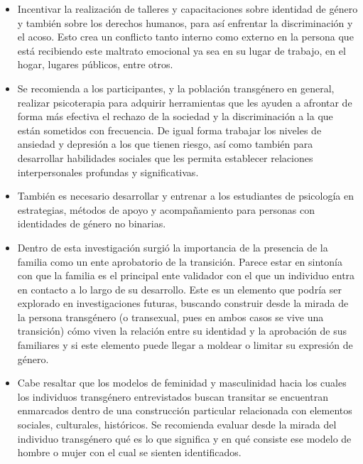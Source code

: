 \begin{itemize}
\item Incentivar la realización de talleres y capacitaciones sobre identidad de
género y también sobre los derechos humanos, para así enfrentar la
discriminación y el acoso. Esto crea un conflicto tanto interno como externo en
la persona que está recibiendo este maltrato emocional ya sea en su lugar de
trabajo, en el hogar, lugares públicos, entre otros.

\item Se recomienda a los participantes, y la población transgénero en general,
realizar psicoterapia para adquirir herramientas que les ayuden a afrontar de
forma más efectiva el rechazo de la sociedad y la discriminación a la que están
sometidos con frecuencia. De igual forma trabajar los niveles de ansiedad y
depresión a los que tienen riesgo, así como también para desarrollar habilidades
sociales que les permita establecer relaciones interpersonales profundas y
significativas.

\item También es necesario desarrollar y entrenar a los estudiantes de
psicología en estrategias, métodos de apoyo y acompañamiento para personas con
identidades de género no binarias.

\item Dentro de esta investigación surgió la importancia de la presencia de la
familia como un ente aprobatorio de la transición. Parece estar en sintonía con
que la familia es el principal ente validador con el que un
individuo entra en contacto a lo largo de su desarrollo. Este es un elemento que
podría ser explorado en investigaciones futuras, buscando construir desde la
mirada de la persona transgénero (o transexual, pues en ambos casos se vive una
transición) cómo viven la relación entre su identidad y la aprobación de sus
familiares y si este elemento puede llegar a moldear o limitar su expresión de
género.

\item Cabe resaltar que los modelos de feminidad y masculinidad hacia los cuales
los individuos transgénero entrevistados buscan transitar se encuentran
enmarcados dentro de una construcción particular relacionada con elementos
sociales, culturales, históricos. Se recomienda evaluar desde la mirada del
individuo transgénero qué es lo que significa y en qué consiste ese modelo de
hombre o mujer con el cual se sienten identificados.
\end{itemize}
